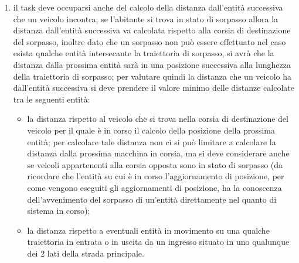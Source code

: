 \begin{enumerate}
\begin{enumerate}
\item il task deve occuparsi anche del calcolo della distanza dall'entità successiva che un veicolo incontra; se l'abitante si trova in stato di sorpasso allora la distanza dall'entità successiva va calcolata rispetto alla corsia di destinazione del sorpasso, inoltre dato che un sorpasso non può essere effettuato nel caso esista qualche entità intersecante la traiettoria di sorpasso, si avrà che la distanza dalla prossima entità sarà in una posizione successiva alla lunghezza della traiettoria di sorpasso;
per valutare quindi la distanza che un veicolo ha dall'entità successiva si deve prendere il valore minimo delle distanze calcolate tra le seguenti entità:
\begin{itemize}
\item la distanza rispetto al veicolo che si trova nella corsia di destinazione del veicolo per il quale è in corso il calcolo della posizione della prossima entità; per calcolare tale distanza non ci si può limitare a calcolare la distanza dalla prossima macchina in corsia, ma si deve considerare anche se veicoli appartenenti alla corsia opposta sono in stato di sorpasso (da ricordare che l'entità su cui è in corso l'aggiornamento di posizione, per come vengono eseguiti gli aggiornamenti di posizione, ha la conoscenza dell'avvenimento del sorpasso di un'entità direttamente nel quanto di sistema in corso);
\item la distanza rispetto a eventuali entità in movimento su una qualche traiettoria in entrata o in uscita da un ingresso situato in uno qualunque dei 2 lati della strada principale. 
\end{itemize}

\end{enumerate}
\end{enumerate}
